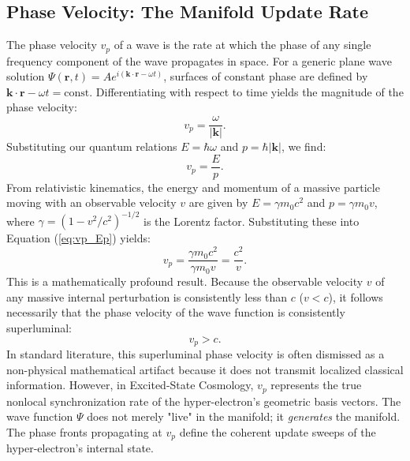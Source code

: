 \subsection{Phase Velocity: The Manifold Update Rate}
The phase velocity $v_p$ of a wave is the rate at which the phase of any single frequency component of the wave propagates in space. For a generic plane wave solution $\Psi(\mathbf{r}, t) = A e^{i(\mathbf{k} \cdot \mathbf{r} - \omega t)}$, surfaces of constant phase are defined by $\mathbf{k} \cdot \mathbf{r} - \omega t = \text{const}$. Differentiating with respect to time yields the magnitude of the phase velocity:
\begin{equation}
    v_p = \frac{\omega}{|\mathbf{k}|}.
\end{equation}
Substituting our quantum relations $E = \hbar \omega$ and $p = \hbar |\mathbf{k}|$, we find:
\begin{equation}
    v_p = \frac{E}{p}. \label{eq:vp_Ep}
\end{equation}
From relativistic kinematics, the energy and momentum of a massive particle moving with an observable velocity $v$ are given by $E = \gamma m_0 c^2$ and $p = \gamma m_0 v$, where $\gamma = (1 - v^2/c^2)^{-1/2}$ is the Lorentz factor. Substituting these into Equation (\ref{eq:vp_Ep}) yields:
\begin{equation}
    v_p = \frac{\gamma m_0 c^2}{\gamma m_0 v} = \frac{c^2}{v}. \label{eq:vp_c2v}
\end{equation}
This is a mathematically profound result. Because the observable velocity $v$ of any massive internal perturbation is consistently less than $c$ ($v < c$), it follows necessarily that the phase velocity of the wave function is consistently superluminal:
\begin{equation}
    v_p > c.
\end{equation}
In standard literature, this superluminal phase velocity is often dismissed as a non-physical mathematical artifact because it does not transmit localized classical information. However, in Excited-State Cosmology, $v_p$ represents the true nonlocal synchronization rate of the hyper-electron's geometric basis vectors. The wave function $\Psi$ does not merely "live" in the manifold; it \textit{generates} the manifold. The phase fronts propagating at $v_p$ define the coherent update sweeps of the hyper-electron's internal state.

